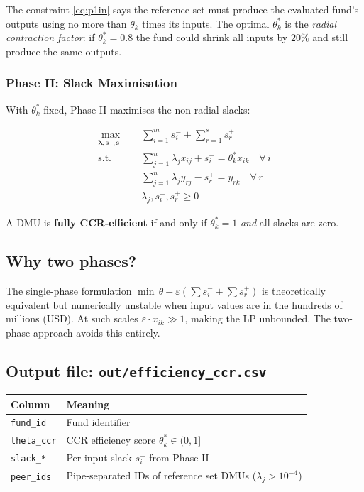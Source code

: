 \documentclass[12pt,a4paper]{article}
\begin{document}
The constraint \eqref{eq:p1in} says the reference set must produce the evaluated
fund's outputs using no more than $\theta_k$ times its inputs.
The optimal $\theta_k^*$ is the \emph{radial contraction factor}: if $\theta_k^* = 0.8$
the fund could shrink all inputs by $20\%$ and still produce the same outputs.

\subsubsection*{Phase II: Slack Maximisation}

With $\theta_k^*$ fixed, Phase II maximises the non-radial slacks:

\begin{align}
    \max_{\boldsymbol{\lambda}, \mathbf{s}^-, \mathbf{s}^+} \quad
    & \sum_{i=1}^{m} s^-_i + \sum_{r=1}^{s} s^+_r \\
    \text{s.t.} \quad
    & \sum_{j=1}^{n} \lambda_j x_{ij} + s^-_i = \theta_k^* x_{ik}
      \quad \forall\, i \\
    & \sum_{j=1}^{n} \lambda_j y_{rj} - s^+_r = y_{rk}
      \quad \forall\, r \\
    & \lambda_j, s^-_i, s^+_r \geq 0
\end{align}

A DMU is \textbf{fully CCR-efficient} if and only if $\theta_k^* = 1$ \emph{and}
all slacks are zero.

\subsection{Why two phases?}

The single-phase formulation $\min\, \theta - \varepsilon(\sum s^-_i + \sum s^+_r)$
is theoretically equivalent but numerically unstable when input values are in the
hundreds of millions (USD).  At such scales $\varepsilon \cdot x_{ik} \gg 1$, making
the LP unbounded.  The two-phase approach avoids this entirely.

\subsection{Output file: \texttt{out/efficiency\_ccr.csv}}

\begin{table}[H]
\centering
\begin{tabular}{ll}
\toprule
\textbf{Column} & \textbf{Meaning} \\
\midrule
\texttt{fund\_id}       & Fund identifier \\
\texttt{theta\_ccr}     & CCR efficiency score $\theta_k^* \in (0,1]$ \\
\texttt{slack\_*}       & Per-input slack $s^-_i$ from Phase II \\
\texttt{peer\_ids}      & Pipe-separated IDs of reference set DMUs ($\lambda_j > 10^{-4}$) \\
\bottomrule
\end{tabular}
\end{table}
\end{document}
